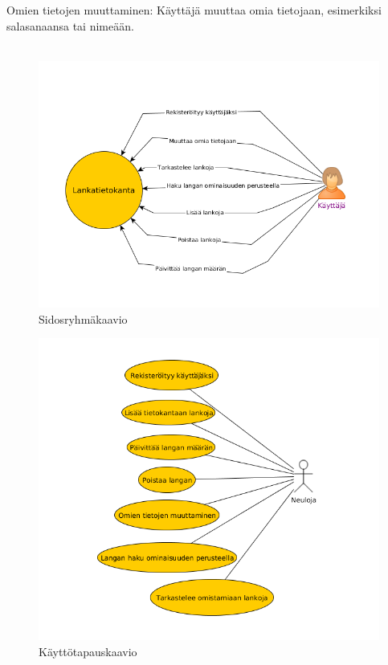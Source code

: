 \documentclass[12pt]{article}
\begin{document}
\\ \ \\
Omien tietojen muuttaminen: Käyttäjä muuttaa omia tietojaan, esimerkiksi salasanaansa tai nimeään.
\\ \ \\
\begin{figure}[!h]
\includegraphics[scale=0.5]{sidosryhmakaavio.png}
\caption{Sidosryhmäkaavio}
\end{figure}
\begin{figure}
\includegraphics[scale=0.5]{kayttotapaukset.png}
\caption{Käyttötapauskaavio}
\end{figure}
\end{document}
